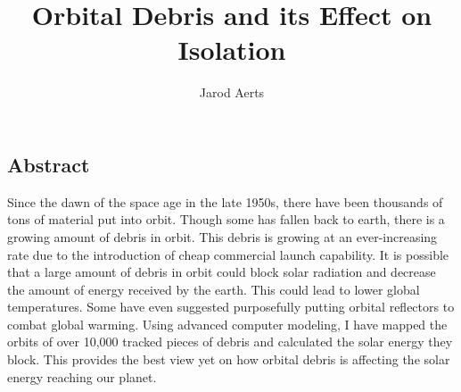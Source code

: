 \documentclass[11pt]{article}
\author{Jarod Aerts\vspace{-2ex}%
}
\title{Orbital Debris and its Effect on Isolation\vspace{-2ex}%
}
\begin{document}
\maketitle

\begin{center}
	\section*{Abstract} \label{abstract}
    Since the dawn of the space age in the late 1950s, there have been thousands of tons of material put into orbit. Though some has fallen back to earth, there is a growing amount of debris in orbit. This debris is growing at an ever-increasing rate due to the introduction of cheap commercial launch capability. It is possible that a large amount of debris in orbit could block solar radiation and decrease the amount of energy received by the earth. This could lead to lower global temperatures. Some have even suggested purposefully putting orbital reflectors to combat global warming. Using advanced computer modeling, I have mapped the orbits of over 10,000 tracked pieces of debris and calculated the solar energy they block. This provides the best view yet on how orbital debris is affecting the solar energy reaching our planet.
\end{center}
\end{document}
